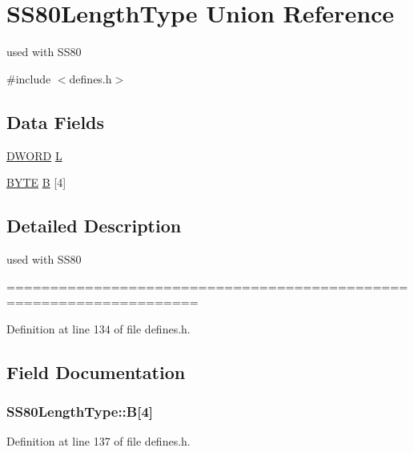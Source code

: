 \hypertarget{unionSS80LengthType}{}\section{S\+S80\+Length\+Type Union Reference}
\label{unionSS80LengthType}


used with S\+S80  




{\ttfamily \#include $<$defines.\+h$>$}

\subsection*{Data Fields}
\begin{DoxyCompactItemize}
\item 
\hyperlink{integer_8h_ad342ac907eb044443153a22f964bf0af}{D\+W\+O\+RD} \hyperlink{unionSS80LengthType_a8939afbd3197ba892aa2b15782086a71}{L}
\item 
\hyperlink{integer_8h_a4ae1dab0fb4b072a66584546209e7d58}{B\+Y\+TE} \hyperlink{unionSS80LengthType_ae34b090db3881e2a81df6daa00e09f96}{B} \mbox{[}4\mbox{]}
\end{DoxyCompactItemize}


\subsection{Detailed Description}
used with S\+S80 

==================================================================== 

Definition at line 134 of file defines.\+h.



\subsection{Field Documentation}
\subsubsection[{\texorpdfstring{B}{B}}]{ S\+S80\+Length\+Type\+::B\mbox{[}4\mbox{]}}\hypertarget{unionSS80LengthType_ae34b090db3881e2a81df6daa00e09f96}{}\label{unionSS80LengthType_ae34b090db3881e2a81df6daa00e09f96}


Definition at line 137 of file defines.\+h.



